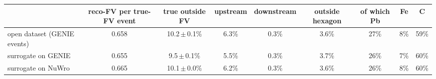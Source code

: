\begin{tabular}{lcccccccc}
\toprule
 & reco-FV per true-FV event & true outside FV & upstream & downstream & outside hexagon & of which Pb & Fe & C \\
\midrule
open dataset (GENIE events) & 0.658 & 10.2\,$\pm$\,0.1\% & 6.3\% & 0.3\% & 3.6\% & 27\% & 8\% & 59\% \\
surrogate on GENIE & 0.655 & 9.5\,$\pm$\,0.1\% & 5.5\% & 0.3\% & 3.7\% & 26\% & 7\% & 60\% \\
surrogate on NuWro & 0.665 & 10.1\,$\pm$\,0.0\% & 6.2\% & 0.3\% & 3.6\% & 26\% & 8\% & 60\% \\
\bottomrule
\end{tabular}
